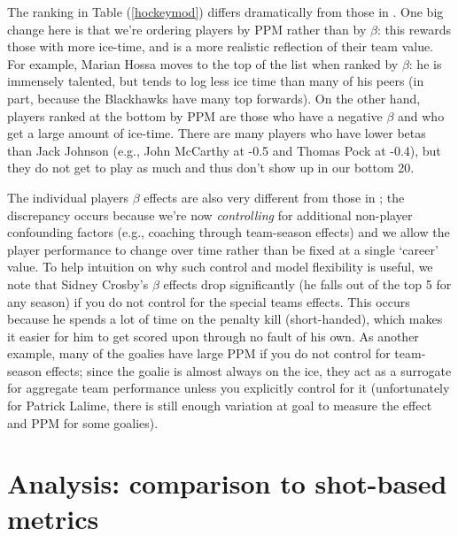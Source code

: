 The ranking in Table (\ref{hockeymod}) differs dramatically from those in
\cite{gramacy:jensen:taddy:2013}.  One big change here is that we're ordering
players by PPM rather than by $\beta$: this rewards those with more ice-time,
and is a more realistic reflection of their team value.  For example, Marian
Hossa moves to the top of the list when ranked by $\beta$: he is immensely
talented, but tends to log less ice time than many of his peers (in part,
because the Blackhawks have many top forwards).  On the other hand, players
ranked at the bottom by PPM are those who have a negative $\beta$ and who get
a large amount of ice-time.  There are many players who have lower betas than
Jack Johnson (e.g., John McCarthy at -0.5 and Thomas Pock at -0.4), but they
do not get to play as much and thus don't show up in our bottom 20.

 The individual players
$\beta$ effects are also very different from those in
\cite{gramacy:jensen:taddy:2013}; the discrepancy occurs because we're now
\textit{controlling} for additional non-player confounding factors (e.g.,
coaching through team-season effects) and we allow the player performance to
change over time rather than be fixed at a single `career' value.   To help
intuition on why such control and model flexibility is useful, we note that
Sidney Crosby's $\beta$ effects drop significantly (he falls out of the top 5
for any season) if you do not control for the special teams effects.  This
occurs because he spends a lot of time on the penalty kill (short-handed),
which makes it easier for him to get scored upon through no fault of his own.
As another example, many of the goalies have large PPM if you do not control
for team-season effects; since the goalie is almost always on the ice, they
act as a surrogate for aggregate team performance unless you explicitly
control for it (unfortunately for Patrick Lalime, there is still enough
variation at goal to measure the effect and PPM for some goalies).

\section{Analysis: comparison to shot-based metrics}
\label{sec:shots}


